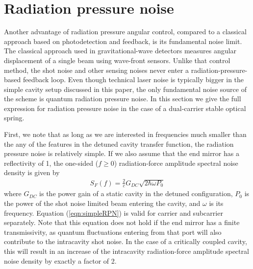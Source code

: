 \section{Radiation pressure noise}
\label{sec:V}

Another advantage of radiation pressure angular control, compared to a classical approach based on photodetection and feedback, is its fundamental noise limit. 
The classical approach used in gravitational-wave detectors measures angular displacement of a single beam using wave-front sensors.
Unlike that control method, the shot noise and other sensing noises %
never enter a radiation-pressure-based feedback loop. Even though technical laser noise is typically bigger in the simple cavity setup discussed in this paper, the only fundamental noise source of the scheme is quantum radiation pressure noise. In this section we give the full expression for radiation pressure noise in the case of a dual-carrier stable optical spring.

First, we note that as long as we are interested in frequencies much smaller than the any of the features in the detuned cavity transfer function, the radiation pressure noise is relatively simple. If we also assume that the end mirror has a reflectivity of 1, the one-sided ($f\ge0$) radiation-force amplitude spectral noise density is given by
\begin{align}
\label{eqn:simpleRPN}
S_F(f) = \frac{2}{c} G_{DC} \sqrt{2 \hbar \omega P_0}
\end{align}
where $G_{DC}$ is the power gain of a static cavity in the detuned configuration, $P_0$ is the power of the shot noise limited beam entering the cavity, and $\omega$ is its frequency.
Equation (\ref{eqn:simpleRPN}) is valid for carrier and subcarrier separately.
Note that this equation does not hold if the end mirror has a finite transmissivity, as quantum fluctuations entering from that port will also contribute to the intracavity shot noise. In the case of a critically coupled cavity, this will result in an increase of the intracavity radiation-force amplitude spectral noise density by exactly a factor of 2.

